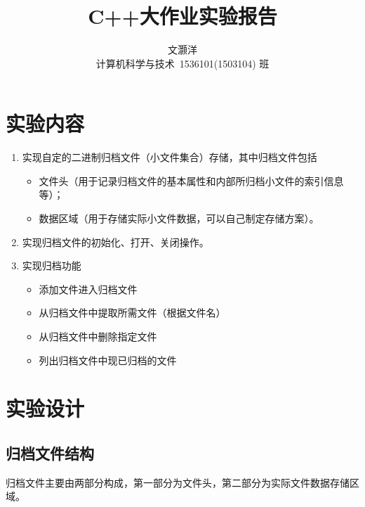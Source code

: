 \documentclass[11pt, a4paper]{article}
\begin{document}
	\begin{CJK*}{UTF8}{gbsn}
		
		\title{\bf C++大作业实验报告}

		\author{文灏洋\\计算机科学与技术\  1536101(1503104) 班}
		\date{}

		\maketitle
		\setlength{\parindent}{2em}
		
		\renewcommand{\contentsname}{\textbf{目录}}
		\tableofcontents
		\newpage
		\newpage
	\section{实验内容}
		\begin{enumerate}
			\item 实现自定的二进制归档文件（小文件集合）存储，其中归档文件包括
				
				\begin{itemize}
					\item 文件头（用于记录归档文件的基本属性和内部所归档小文件的索引信息等）；
					\item 数据区域（用于存储实际小文件数据，可以自己制定存储方案）。
				\end{itemize}
			\item 实现归档文件的初始化、打开、关闭操作。
			\item 实现归档功能
			
				\begin{itemize}
					\item 添加文件进入归档文件
					\item 从归档文件中提取所需文件（根据文件名）
					\item 从归档文件中删除指定文件
					\item 列出归档文件中现已归档的文件
				\end{itemize}
		\end{enumerate}
	
	\section{实验设计}
		\subsection{归档文件结构}
			归档文件主要由两部分构成，第一部分为文件头，第二部分为实际文件数据存储区域。

\end{CJK*}
\end{document}

